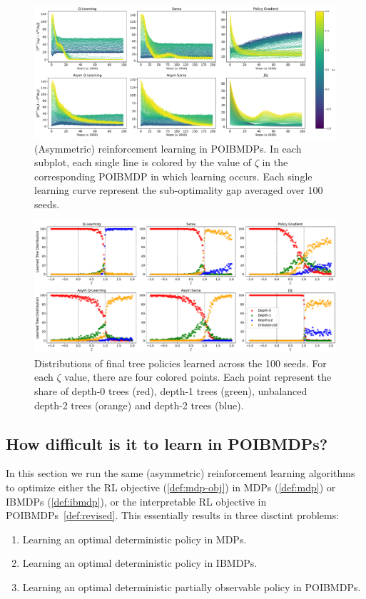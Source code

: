 \begin{figure}
    \centering
    \includegraphics[width=1\textwidth]{images/images_part1/learning_curves.pdf}
    \caption{(Asymmetric) reinforcement learning in POIBMDPs. 
    In each subplot, each single line is colored by the value of $\zeta$ in the corresponding POIBMDP in which learning occurs. 
    Each single learning curve represent the sub-optimality gap averaged over 100 seeds.
    }\label{fig:rl-poibmdp}
\end{figure}

\begin{figure}
    \centering
    \includegraphics[width=1\textwidth]{images/images_part1/tree_distributions.pdf}
    \caption{Distributions of final tree policies learned across the 100 seeds.
    For each $\zeta$ value, there are four colored points. Each point represent the share of depth-0 trees (red), depth-1 trees (green), unbalanced depth-2 trees (orange) and depth-2 trees (blue).
    }\label{fig:dt-distrib-poibmdp}
\end{figure}


\subsection{How difficult is it to learn in POIBMDPs?}

In this section we run the same (asymmetric) reinforcement learning algorithms to optimize either the RL objective (\ref{def:mdp-obj}) in MDPs (\ref{def:mdp}) or IBMDPs (\ref{def:ibmdp}), or the interpretable RL objective in POIBMDPs~\ref{def:revised}.
This essentially results in three disctint problems:
\begin{enumerate}
    \item Learning an optimal deterministic policy in MDPs.
    \item Learning an optimal deterministic policy in IBMDPs.
    \item Learning an optimal deterministic partially observable policy in POIBMDPs.
\end{enumerate}

